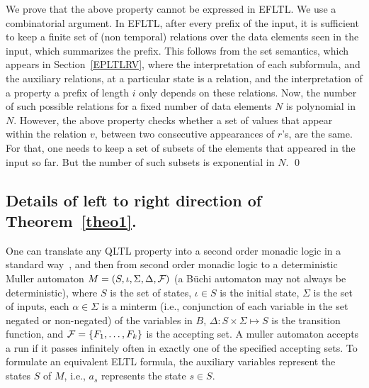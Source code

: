 \documentclass{llncs}
\begin{document}
We prove that the above property cannot be expressed in EFLTL.
We use a combinatorial argument.
In EFLTL, after every prefix of the input, it is
sufficient to keep a finite set of (non temporal) relations over the
data elements seen in the input, which
summarizes the prefix. This follows from the set
semantics, which appears in Section~\ref{EPLTLRV}, 
where the interpretation of
each subformula, and the auxiliary relations,
at a particular state is a relation, and the interpretation 
of a property a prefix of length $i$ only depends on
these relations. Now, the number of such possible relations
for a fixed number of data elements $N$ is polynomial
in $N$. However, the above property checks whether
a set of values that appear within the relation $v$, between two consecutive appearances
of $r$'s, are the same. For that, one needs to keep a set of
subsets of the elements that appeared in the input so far. 
But the number of such subsets is exponential in $N$. \qed


\iffalse
{\bf Comments.} First, note that the reason that QFLTL {\em can} express the property in Theorem~\ref{theo2}, is that it allows to augment the input relations with auxiliary relations that are not fixed. That is, for an auxiliary relation $R$,
$R [ i ]$ is not fixed, and can change per different
prefixes (of length at least $i$), or even in different
subformulas. Second, given a simple extension to EFLTL, where 
one can use a variable that represents an updatable
counter (or a generator of distinct values), one can express the property used in~\ref{theo2}, by
keeping a relation where values between different occurrences of the event $r$ are paired with distinct values, hence, representing an unbounded set of sets.
\fi

\subsection*{Details of left to right direction of Theorem~\ref{theo1}.}
One can translate any QLTL property into a second order monadic logic in a standard
way~\cite{Thomas}, and then from
second order monadic logic to a deterministic Muller automaton $M = (S, \iota , \Sigma, \Delta, {\cal F})$ (a B\"{u}chi automaton may not always be deterministic), where $S$ is the set of states, $\iota \in S$ is the initial state, $\Sigma$ is the set of inputs, each $\alpha \in \Sigma$ is a minterm (i.e., conjunction of
each variable in the set negated or non-negated) of the variables in $B$, $\Delta : S \times \Sigma \mapsto S$ is the transition function, and ${\cal F} = \{ F_1 , \ldots , F_k \}$ is the accepting set. A muller automaton 
accepts a run if it 
passes infinitely often in exactly
one of the specified accepting sets. To formulate an equivalent ELTL formula,
the auxiliary variables represent the states $S$ of $M$, i.e., $a_s$ represents the state $s \in S$.
\end{document}
